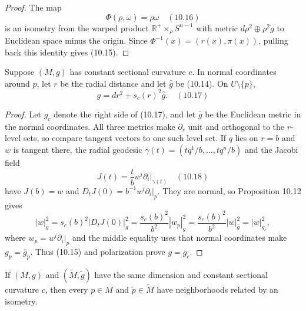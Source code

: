 \begin{proof}
\sketch
The map
\begin{equation}
\Phi(\rho,\omega)=\rho\omega \quad (10.16)
\end{equation}
is an isometry from the warped product
$\mathbb R^+\times_\rho S^{n-1}$ with metric
$d\rho^2\oplus\rho^2\check g$ to Euclidean space minus the origin.  Since
$\Phi^{-1}(x)=(r(x),\pi(x))$, pulling back this identity gives (10.15).
\end{proof}

\begin{theorem}
\label{thm:constant-curvature-normal-coords}

Suppose $(M,g)$ has constant sectional curvature $c$.  In normal coordinates
around $p$, let $r$ be the radial distance and let $\hat g$ be (10.14).  On
$U\setminus\{p\}$,
\begin{equation}
g=dr^2+s_c(r)^2\hat g. \quad (10.17)
\end{equation}
\end{theorem}

\begin{proof}
\sketch
Let $g_c$ denote the right side of (10.17), and let $\bar g$ be the Euclidean
metric in the normal coordinates.  All three metrics make $\partial_r$ unit
and orthogonal to the $r$-level sets, so compare tangent vectors to one such
level set.  If $q$ lies on $r=b$ and $w$ is tangent there, the radial geodesic
$\gamma(t)=(tq^1/b,\ldots,tq^n/b)$ and the Jacobi field
\begin{equation}
J(t)=\frac{t}{b}w^i\partial_i\bigg|_{\gamma(t)} \quad (10.18)
\end{equation}
have $J(b)=w$ and $D_tJ(0)=b^{-1}w^i\partial_i|_p$.  They are normal, so
Proposition 10.12 gives
\[
|w|_g^2=s_c(b)^2|D_tJ(0)|_g^2
=\frac{s_c(b)^2}{b^2}|w_p|_g^2
=\frac{s_c(b)^2}{b^2}|w|_{\bar g}^2
=|w|_{g_c}^2,
\]
where $w_p=w^i\partial_i|_p$ and the middle equality uses that normal
coordinates make $g_p=\bar g_p$.  Thus (10.15) and polarization prove
$g=g_c$.
\end{proof}

\begin{corollary}
\label{cor:local-uniqueness-constant-curvature}

If $(M,g)$ and $(\widetilde M,\widetilde g)$ have the same dimension and
constant sectional curvature $c$, then every $p\in M$ and
$\widetilde p\in\widetilde M$ have neighborhoods related by an isometry.
\end{corollary}

